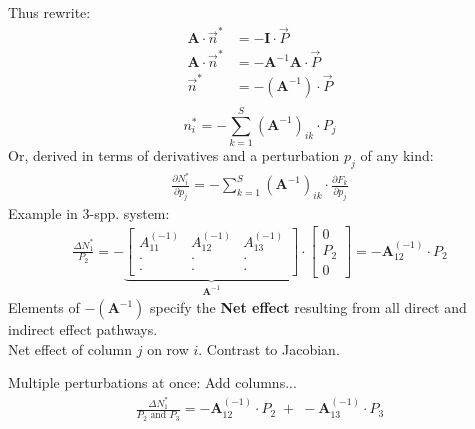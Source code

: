 \documentclass{article}
\newcommand{\note}[1]{\colorbox{gray!30}{#1}}
\newcommand{\ind}{\-\hspace{1cm}}
\begin{document}
Thus rewrite:
\begin{align*}
	\mathbf{A}\cdot \vec{n}^*&=-\mathbf{I}\cdot \vec{P}\\
	\mathbf{A}\cdot \vec{n}^*&=-\mathbf{A}^{-1}\mathbf{A}\cdot \vec{P}\\
	 \vec{n}^*&=-(\mathbf{A}^{-1})\cdot \vec{P}\\
\end{align*}
\begin{equation*}
	n_i^* = -\sum_{k=1}^S(\mathbf{A}^{-1})_{ik}\cdot P_j
\end{equation*}
Or, derived in terms of derivatives and a perturbation $p_j$ of any kind:
\begin{align*}
	\frac{\partial N_i^*}{\partial p_j}=-\sum_{k=1}^S(\mathbf{A}^{-1})_{ik}\cdot \frac{\partial F_k}{\partial p_j}
\end{align*}
Example in 3-spp. system:
\begin{align*}
	\frac{\Delta N_1^*}{P_2}=-\underbrace{\begin{bmatrix} A_{11}^{(-1)} & A_{12}^{(-1)} & A_{13}^{(-1)} \\ \cdot & \cdot & \cdot   \\ \cdot & \cdot & \cdot \end{bmatrix}}_{\mathbf{A}^{-1}} \cdot \begin{bmatrix} 0 \\ P_2 \\ 0 \end{bmatrix} = -\mathbf{A}_{12}^{(-1)} \cdot P_2
\end{align*}
Elements of $-(\mathbf{A}^{-1})$ specify the \textbf{Net effect} resulting from all direct and indirect effect pathways.\\
\ind Net effect of column $j$ on row $i$. \note{Contrast to Jacobian.}

Multiple perturbations at once:  Add columns...
\begin{align*}
	 \frac{\Delta N_1^*}{P_2 \text{ and } P_3}=  -\mathbf{A}_{12}^{(-1)} \cdot P_2 \; + \; -\mathbf{A}_{13}^{(-1)} \cdot P_3
\end{align*}
\end{document}

